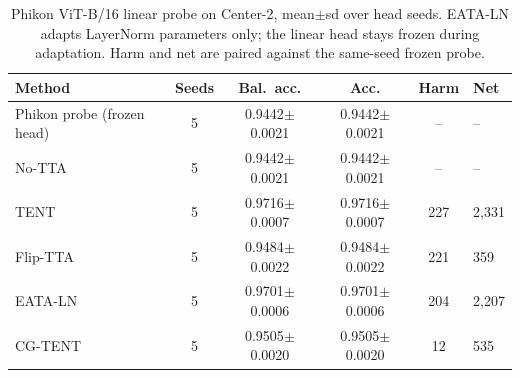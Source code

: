 \begin{table}[t]
\centering
\small
\setlength{\tabcolsep}{4pt}
\caption{Phikon ViT-B/16 linear probe on Center-2, mean$\pm$sd over head seeds. EATA-LN adapts LayerNorm parameters only; the linear head stays frozen during adaptation. Harm and net are paired against the same-seed frozen probe.}
\label{tab:phikon-eata}
\begin{tabular}{@{}lcccc@{}}
\toprule
Method & Seeds & Bal.\ acc. & Acc. & Harm & Net \\
\midrule
Phikon probe (frozen head) & 5 & 0.9442$\pm$0.0021 & 0.9442$\pm$0.0021 & -- & -- \\
No-TTA & 5 & 0.9442$\pm$0.0021 & 0.9442$\pm$0.0021 & -- & -- \\
TENT & 5 & 0.9716$\pm$0.0007 & 0.9716$\pm$0.0007 & 227 & 2{,}331 \\
Flip-TTA & 5 & 0.9484$\pm$0.0022 & 0.9484$\pm$0.0022 & 221 & 359 \\
EATA-LN & 5 & 0.9701$\pm$0.0006 & 0.9701$\pm$0.0006 & 204 & 2{,}207 \\
CG-TENT & 5 & 0.9505$\pm$0.0020 & 0.9505$\pm$0.0020 & 12 & 535 \\
\bottomrule
\end{tabular}
\end{table}
